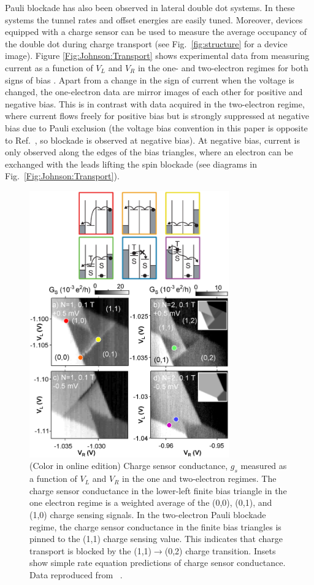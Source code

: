 \documentclass[12pt,aps,nofootinbib]{revtex4-1}
\begin{document}
Pauli blockade has also been observed in lateral double dot
systems. In these systems the tunnel rates and offset energies are
easily tuned. Moreover, devices equipped with a charge sensor can
be used to measure the average occupancy of the double dot during
charge transport (see Fig.\ \ref{fig:structure} for a device
image). Figure \ref{Fig:Johnson:Transport} shows experimental data
from measuring current as a function of $V_L$ and $V_R$ in the one-
and two-electron regimes for both signs of bias
\cite{JohnsonSpinBlock}. Apart from a change in the sign of
current when the voltage is changed, the one-electron data are
mirror images of each other for positive and negative bias. This
is in contrast with data acquired in the two-electron regime,
where current flows freely for positive bias but is strongly
suppressed at negative bias due to Pauli exclusion (the voltage
bias convention in this paper is opposite to Ref.\
\cite{OnoSpinBlock}, so blockade is observed at negative bias). At
negative bias, current is only observed along the edges of the
bias triangles, where an electron can be exchanged with the leads
lifting the spin blockade (see diagrams in Fig.\ \ref{Fig:Johnson:Transport}).

\begin{figure}[hbt]
\begin{center}
\includegraphics[width=8.6cm]{hanson_fig35.eps}
\end{center}
\caption{(Color in online edition) Charge sensor conductance, $g_s$
measured as a function of $V_L$ and $V_R$ in the one and
two-electron regimes. The charge sensor conductance in the
lower-left finite bias triangle in the one electron regime is a
weighted average of the (0,0), (0,1), and (1,0) charge sensing
signals. In the two-electron Pauli blockade regime, the charge
sensor conductance in the finite bias triangles is pinned to the
(1,1) charge sensing value. This indicates that charge transport
is blocked by the (1,1)$\rightarrow$(0,2) charge transition.
Insets show simple rate equation predictions of charge sensor
conductance. Data
reproduced from ~\textcite{JohnsonSpinBlock}.}%
\label{Fig:Johnson:Sensing}
\end{figure}
\end{document}
